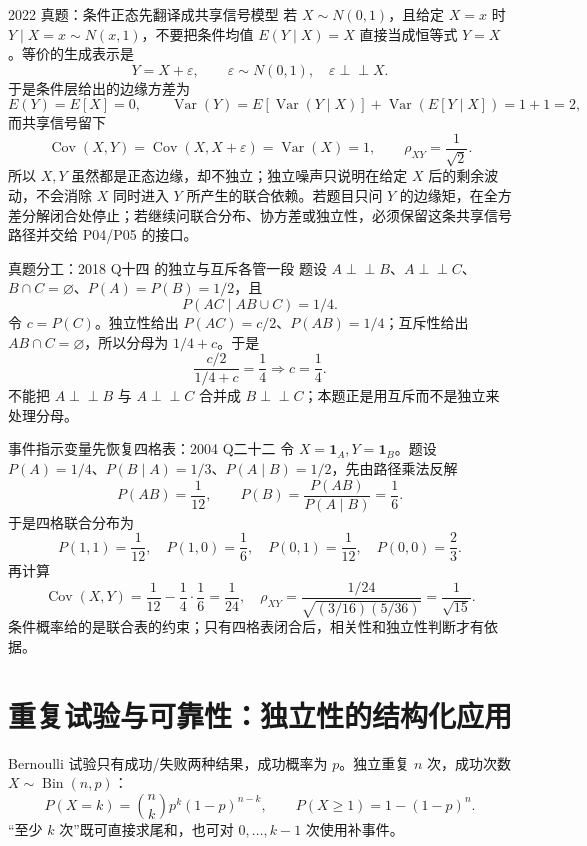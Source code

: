 \documentclass[11pt,a4paper]{ctexart}
\newcommand{\indep}{\mathrel{\perp\!\!\!\perp}}
\begin{document}
\begin{examplebox}{2022 真题：条件正态先翻译成共享信号模型}
若 $X\sim N(0,1)$，且给定 $X=x$ 时 $Y\mid X=x\sim N(x,1)$，不要把条件均值 $E(Y\mid X)=X$ 直接当成恒等式 $Y=X$。等价的生成表示是
\[
Y=X+\varepsilon,\qquad \varepsilon\sim N(0,1),\quad \varepsilon\indep X.
\]
于是条件层给出的边缘方差为
\[
E(Y)=E[X]=0,\qquad
\operatorname{Var}(Y)=E[\operatorname{Var}(Y\mid X)]+\operatorname{Var}(E[Y\mid X])=1+1=2,
\]
而共享信号留下
\[
\operatorname{Cov}(X,Y)=\operatorname{Cov}(X,X+\varepsilon)=\operatorname{Var}(X)=1,
\qquad
\rho_{XY}=\frac1{\sqrt2}.
\]
所以 $X,Y$ 虽然都是正态边缘，却不独立；独立噪声只说明在给定 $X$ 后的剩余波动，不会消除 $X$ 同时进入 $Y$ 所产生的联合依赖。若题目只问 $Y$ 的边缘矩，在全方差分解闭合处停止；若继续问联合分布、协方差或独立性，必须保留这条共享信号路径并交给 P04/P05 的接口。
\end{examplebox}

\begin{examplebox}{真题分工：2018 Q十四 的独立与互斥各管一段}
题设 $A\indep B$、$A\indep C$、$B\cap C=\varnothing$、$P(A)=P(B)=1/2$，且
\[
P(AC\mid AB\cup C)=1/4.
\]
令 $c=P(C)$。独立性给出 $P(AC)=c/2$、$P(AB)=1/4$；互斥性给出 $AB\cap C=\varnothing$，所以分母为 $1/4+c$。于是
\[
\frac{c/2}{1/4+c}=\frac14\Longrightarrow c=\frac14.
\]
不能把 $A\indep B$ 与 $A\indep C$ 合并成 $B\indep C$；本题正是用互斥而不是独立来处理分母。
\end{examplebox}

\begin{examplebox}{事件指示变量先恢复四格表：2004 Q二十二}
令 $X=\mathbf1_A,Y=\mathbf1_B$。题设 $P(A)=1/4$、$P(B\mid A)=1/3$、$P(A\mid B)=1/2$，先由路径乘法反解
\[
P(AB)=\frac1{12},\qquad P(B)=\frac{P(AB)}{P(A\mid B)}=\frac16.
\]
于是四格联合分布为
\[
P(1,1)=\frac1{12},\quad P(1,0)=\frac16,
\quad P(0,1)=\frac1{12},\quad P(0,0)=\frac23.
\]
再计算
\[
\operatorname{Cov}(X,Y)=\frac1{12}-\frac14\cdot\frac16=\frac1{24},\quad
\rho_{XY}=\frac{1/24}{\sqrt{(3/16)(5/36)}}=\frac1{\sqrt{15}}.
\]
条件概率给的是联合表的约束；只有四格表闭合后，相关性和独立性判断才有依据。
\end{examplebox}

\section{重复试验与可靠性：独立性的结构化应用}

Bernoulli 试验只有成功/失败两种结果，成功概率为 $p$。独立重复 $n$ 次，成功次数 $X\sim\operatorname{Bin}(n,p)$：
\[
P(X=k)=\binom nkp^k(1-p)^{n-k},\qquad
P(X\ge1)=1-(1-p)^n.
\]
“至少 $k$ 次”既可直接求尾和，也可对 $0,\ldots,k-1$ 次使用补事件。
\end{document}

